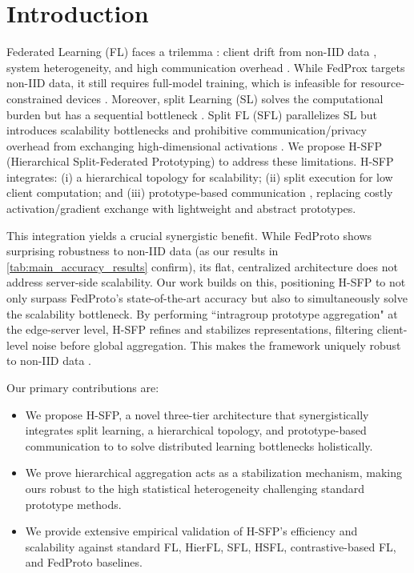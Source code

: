\section{Introduction}
\label{sec:intro} 
    Federated Learning (FL) \cite{pmlr-v54-mcmahan17a} faces a trilemma \cite{9084352,MAL-083}: client drift from non-IID data \cite{9084352, GUPTA20181}, system heterogeneity, and high communication overhead \cite{MAL-083}. While FedProx \cite{9084352, dai2023tacklingFedProx} targets non-IID data, it still requires full-model training, which is infeasible for resource-constrained devices \cite{10825769}. Moreover, split Learning (SL) \cite{GUPTA20181, vepakomma2019split} solves the computational burden but has a sequential bottleneck \cite{thapa2022splitfed}. Split FL (SFL) \cite{thapa2022splitfed} parallelizes SL but introduces scalability bottlenecks \cite{10980018} and prohibitive communication/privacy overhead from exchanging high-dimensional activations \cite{11091500, zhang2025amperecommunicationefficienthighaccuracysplit, qiu2023evaluating,wang2025towards}. We propose H-SFP (Hierarchical Split-Federated Prototyping) to address these limitations. H-SFP integrates: (i) a hierarchical topology \cite{10980018, 9148862} for scalability; (ii) split execution \cite{GUPTA20181} for low client computation; and (iii) prototype-based communication \cite{tan2022fedproto}, replacing costly activation/gradient exchange \cite{11091500} with lightweight and abstract prototypes. 
    
    This integration yields a crucial synergistic benefit. While FedProto \cite{tan2022fedproto} shows surprising robustness to non-IID data (as our results in \cref{tab:main_accuracy_results} confirm), its flat, centralized architecture does not address server-side scalability. Our work builds on this, positioning H-SFP to not only surpass FedProto's state-of-the-art accuracy but also to simultaneously solve the scalability bottleneck. By performing ``intragroup prototype aggregation" at the edge-server level, H-SFP refines and stabilizes representations, filtering client-level noise before global aggregation. This makes the framework uniquely robust to non-IID data \cite{9084352, GUPTA20181}.

    Our primary contributions are: 
    \begin{itemize} 
        \item We propose H-SFP, a novel three-tier architecture that synergistically integrates split learning, a hierarchical topology, and prototype-based communication to to solve distributed learning bottlenecks holistically. 
        \item We prove hierarchical aggregation acts as a stabilization mechanism, making ours robust to the high statistical heterogeneity challenging standard prototype methods. 
        \item We provide extensive empirical validation of H-SFP's efficiency and scalability against standard FL, HierFL, SFL, HSFL, contrastive-based FL, and FedProto baselines. 
    \end{itemize}